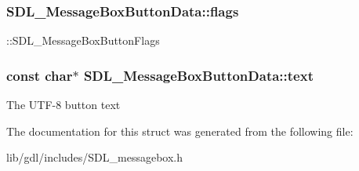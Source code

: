 \subsubsection[{flags}]{ S\+D\+L\+\_\+\+Message\+Box\+Button\+Data\+::flags}\label{struct_s_d_l___message_box_button_data_a426c8b5da0e718242c7840706d95de0b}
\+::\+S\+D\+L\+\_\+\+Message\+Box\+Button\+Flags \hypertarget{struct_s_d_l___message_box_button_data_af35f3062f0577159284c8828caaf08e4}{}
\subsubsection[{text}]{\setlength{\rightskip}{0pt plus 5cm}const char$\ast$ S\+D\+L\+\_\+\+Message\+Box\+Button\+Data\+::text}\label{struct_s_d_l___message_box_button_data_af35f3062f0577159284c8828caaf08e4}
The U\+T\+F-\/8 button text 

The documentation for this struct was generated from the following file\+:\begin{DoxyCompactItemize}
\item 
lib/gdl/includes/S\+D\+L\+\_\+messagebox.\+h\end{DoxyCompactItemize}
